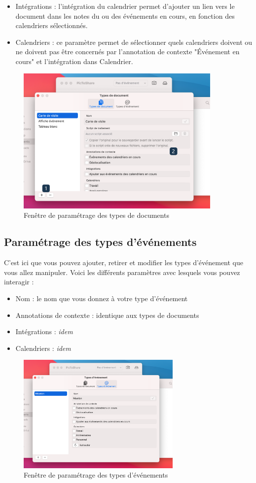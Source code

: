 \documentclass[a4paper,11pt]{article}
\begin{document}
\begin{itemize}
		\item Intégrations : l'intégration du calendrier permet d'ajouter un lien vers le document dans les notes du ou des événements en cours, en fonction des calendriers sélectionnés.
		
		\item Calendriers : ce paramètre permet de sélectionner quels calendriers doivent ou ne doivent pas être concernés par l'annotation de contexte "Événement en cours" et l'intégration dans Calendrier.
	\end{itemize}
	
	\newpage
	
	\begin{figure}[h!]
		\centering
		\includegraphics[width=10cm]{Type_de_doc}
		\caption{Fenêtre de paramétrage des types de documents}
	\end{figure}
	
	\subsection{Paramétrage des types d'événements}
	C'est ici que vous pouvez ajouter, retirer et modifier les types d'événement que vous allez manipuler.
	Voici les différents paramètres avec lesquels vous pouvez interagir :
	\begin{itemize}
		\item Nom : le nom que vous donnez à votre type d'événement
		\item Annotations de contexte : identique aux types de documents
		\item Intégrations : \textit{idem}
		\item Calendriers : \textit{idem}
	\end{itemize}
	
	\begin{figure}[h!]
		\centering
		\includegraphics[width=8cm]{Type_d_event}
		\caption{Fenêtre de paramétrage des types d'événements}
	\end{figure}
	
\end{document}
